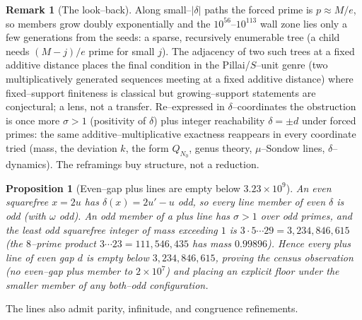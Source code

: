\documentclass[11pt]{article}
\newtheorem{proposition}[theorem]{Proposition}
\theoremstyle{definition}
\newtheorem{remark}[theorem]{Remark}
\begin{document}
\begin{remark}[The look--back]
Along small--$|\delta|$ paths the forced prime is $p\approx M/e$, so members grow doubly exponentially and
the $10^{56}$--$10^{113}$ wall zone lies only a few generations from the seeds: a sparse, recursively
enumerable tree (a child needs $(M-j)/e$ prime for small $j$). The adjacency of two such trees at a fixed
additive distance places the final condition in the Pillai/$S$--unit genre (two multiplicatively
generated sequences meeting at a fixed additive distance) where fixed--support finiteness is classical but
growing--support statements are conjectural; a lens, not a transfer. Re--expressed in $\delta$--coordinates
the obstruction is once more $\sigma>1$ (positivity of $\delta$) plus integer reachability $\delta=\pm d$
under forced primes: the same additive--multiplicative exactness reappears in every coordinate tried (mass,
the deviation $k$, the form $Q_{N_0}$, genus theory, $\mu$--Sondow lines, $\delta$--dynamics). The reframings
buy structure, not a reduction.
\end{remark}

\begin{proposition}[Even--gap plus lines are empty below $3.23\times10^9$]\label{prop:oddthr}
An even squarefree $x=2u$ has $\delta(x)=2u'-u$ odd, so every line member of even $\delta$ is odd (with
$\omega$ odd). An odd member of a plus line has $\sigma>1$ over odd primes, and the least odd squarefree
integer of mass exceeding $1$ is $3\cdot5\cdots29=3{,}234{,}846{,}615$ (the $8$--prime product
$3\cdots23=111{,}546{,}435$ has mass $0.99896$). Hence every plus line of even gap $d$ is empty below
$3{,}234{,}846{,}615$, proving the census observation (no even--gap plus member to $2\times10^7$) and placing
an explicit floor under the smaller member of any both--odd configuration.
\end{proposition}

The lines also admit parity, infinitude, and congruence refinements.
\end{document}
